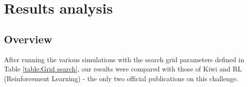 \begin{table}[!ht]
    \centering
    \caption{Grid search}
    \label{table:Grid search}
\end{table}

\section{Results analysis}
\subsection{Overview}

After running the various simulations with the search grid parameters defined in Table \ref{table:Grid search}, our results were compared with those of Kiwi and RL (Reinforcement Learning) \cite{reinforcement_learning_yaro} - the only two official publications on this challenge.

